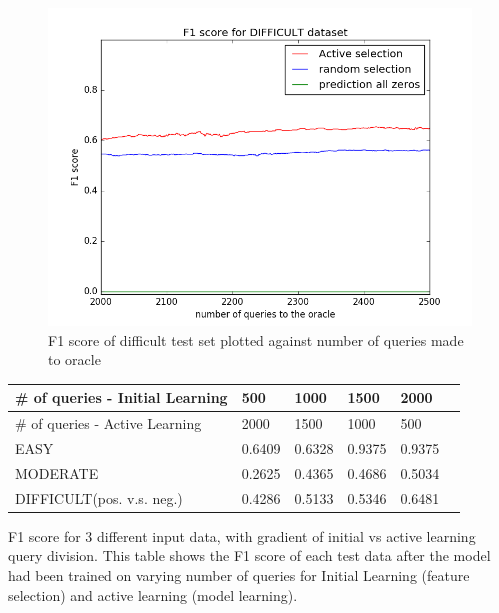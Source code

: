 \documentclass[paper=a4, fontsize=11pt]{scrartcl}
\numberwithin{equation}{section}    %
\numberwithin{figure}{section}      %
\numberwithin{table}{section}       %
\numberwithin{equation}{section}    %
\numberwithin{figure}{section}      %
\numberwithin{table}{section}       %
\begin{document}
\begin{figure}[!htb]
  \centering
  \includegraphics[scale = 0.5]{figures/f1_difficult.png}
      \caption{F1 score of difficult test set plotted against number of queries made to oracle}
      \label{hardf}
\end{figure}

\FloatBarrier

\begin{minipage}{\linewidth}
\smallskip
\centering
{} \label{f1table} 
\begin{tabular}{ p{2in} C{.85in} *4{C{.7in}}}\toprule[1.5pt]
\# of queries - Initial Learning & 500 & 1000 & 1500 & 2000  \\ \toprule[1.5pt]
\# of queries - Active Learning & 2000 & 1500 & 1000 & 500  \\ \bottomrule[1.25pt]
EASY                        & 0.6409                             & 0.6328                              & 0.9375                              & 0.9375                              \\
MODERATE                    & 0.2625                             & 0.4365                              & 0.4686                              & 0.5034                              \\
DIFFICULT(pos. v.s. neg.)   & 0.4286                             & 0.5133                              & 0.5346                              & 0.6481\\
\bottomrule[1.25pt]
\end{tabular} \par \bigskip
F1 score for 3 different input data, with gradient of initial vs active learning query division. 
This table shows the F1 score of each test data after the model had been trained on varying number of queries for Initial Learning (feature selection) and active learning (model learning). 
\end{minipage}
\FloatBarrier
\end{document}
